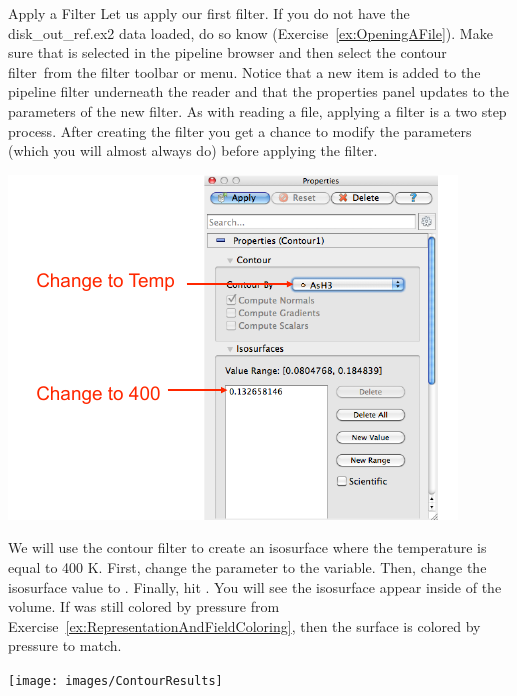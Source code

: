 \begin{exercise}{Apply a Filter}
  \label{ex:ApplyAFilter}%
  Let us apply our first filter.  If you do not have the disk\_out\_ref.ex2
  data loaded, do so know (Exercise~\ref{ex:OpeningAFile}).  Make sure that
   is selected in the pipeline browser and then
  select the contour filter~\contour from the filter toolbar or
   menu.  Notice that a new item is added to the pipeline
  filter underneath the reader and that the properties panel updates to the
  parameters of the new filter.  As with reading a file, applying a filter
  is a two step process.  After creating the filter you get a chance to
  modify the parameters (which you will almost always do) before applying
  the filter.


  \begin{inlinefig}
    \includegraphics[scale=\bbscale]{images/ContourOptions}
  \end{inlinefig}

  We will use the contour filter to create an isosurface where the
  temperature is equal to 400 K.  First, change the 
  parameter to the  variable.  Then, change the isosurface value
  to .  Finally, hit \apply.  You will see the isosurface appear
  inside of the volume.  If  was still colored by
  pressure from Exercise~\ref{ex:RepresentationAndFieldColoring}, then the
  surface is colored by pressure to match.

  \begin{inlinefig}
    \texttt{[image: images/ContourResults]}
  \end{inlinefig}

\end{exercise}

